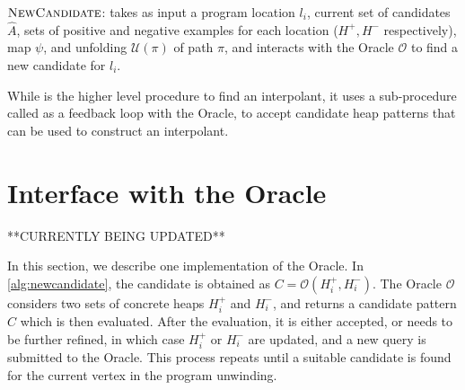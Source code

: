 \begin{algorithm}[ht]


  \caption{$\textsc{NewCandidate}$: takes as input a program location $l_i$, current set of candidates $\hat{A}$, sets of positive and negative examples for each location ($H^{+}, H^{-}$ respectively), map $\psi$, and unfolding $\mathcal{U}(\pi)$ of path $\pi$, and interacts with the Oracle $\mathcal{O}$ to find a new candidate for $l_i$.}
  \label{alg:newcandidate}
\end{algorithm}

While \seplearner is the higher level procedure to find an interpolant, it uses a sub-procedure called \newcandidate as a feedback loop with the Oracle, to accept candidate heap patterns that can be used to construct an interpolant.

\section{Interface with the Oracle}
\label{sec:interface-oracle}

**CURRENTLY BEING UPDATED**

In this section, we describe one implementation of the Oracle. In \autoref{alg:newcandidate}, the candidate is obtained as $C = \mathcal{O}(H_i^{+}, H_i^{-})$. The Oracle $\mathcal{O}$ considers two sets of concrete heaps $H_i^{+}$ and $H_i^{-}$, and returns a candidate pattern $C$ which is then evaluated. After the evaluation, it is either accepted, or needs to be further refined, in which case $H_i^{+}$ or $H_i^{-}$ are updated, and a new query is submitted to the Oracle. This process repeats until a suitable candidate is found for the current vertex in the program unwinding.

